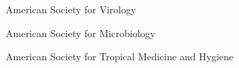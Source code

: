 

\begin{cvhonors}

  \cvhonor
    {American Society for Virology} %
    {} %
    {} %
    {} %

  \cvhonor
    {American Society for Microbiology} %
    {} %
    {} %
    {} %

  \cvhonor
    {American Society for Tropical Medicine and Hygiene} %
    {} %
    {} %
    {} %


\end{cvhonors}

